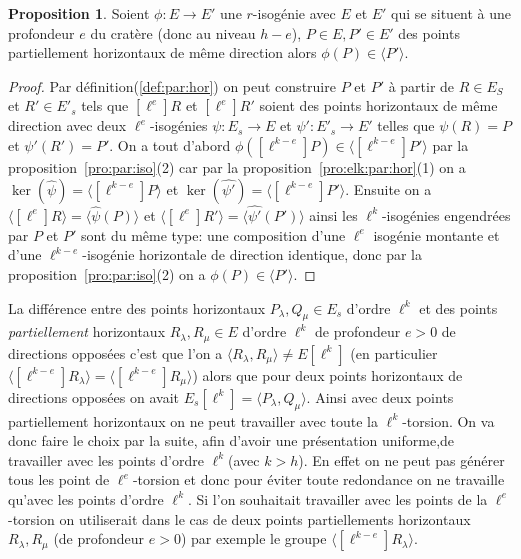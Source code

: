 \documentclass[10pt,a4paper]{book}
\theoremstyle{plain}
\theoremstyle{definition}
\theoremstyle{definition}
\theoremstyle{definition}
\newtheorem{prop}[thm]{Proposition}
\theoremstyle{definition}
\theoremstyle{remark}
\theoremstyle{remark}
\theoremstyle{definition}
\begin{document}
\begin{prop}
\label{pro:par:hor:par}
Soient $\phi: E \rightarrow E'$ une $r$-isogénie avec $E$ et $E'$ qui se
situent à une profondeur $e$ du cratère (donc au niveau $h-e$), $P \in E,P' \in
E'$ des points partiellement horizontaux de même direction alors $\phi(P) \in 
\langle P' \rangle$. 
\end{prop}

\begin{proof}
Par définition(\ref{def:par:hor}) on peut construire $P$ et $P'$ à 
partir de $R \in E_S$ et $R' \in E'_s$ tels que $[\ell^e]R$ et $[\ell^e]R'$ 
soient des points horizontaux de même direction avec deux $\ell^e$-isogénies 
$\psi:E_s \rightarrow E$ et $\psi':E'_s \rightarrow E'$ telles que $\psi(R)=P$ 
et $\psi'(R')=P'$. On a tout d'abord $ \phi([\ell^{k-e}]P) \in \langle 
[\ell^{k-e}]P' \rangle$  par la proposition~\ref{pro:par:iso}(2) car par la 
proposition~\ref{pro:elk:par:hor}(1) on a $\ker(\widehat{\psi})= \langle 
[\ell^{k-e}]P \rangle$ et $\ker(\widehat{\psi'})= \langle [\ell^{k-e}]P' 
\rangle$. Ensuite on a $\langle [\ell^e]R \rangle = \langle 
\widehat{\psi}(P) \rangle $ et $\langle [\ell^e]R' \rangle = \langle 
\widehat{\psi'}(P') \rangle$ ainsi les $\ell^{k}$-isogénies engendrées par 
$P$ et $P'$ sont du même type: une composition d'une $\ell^e$ isogénie montante 
et d'une $\ell^{k-e}$-isogénie horizontale de direction identique, donc par la 
proposition~\ref{pro:par:iso}(2) on a $\phi(P) \in \langle P' \rangle$.
\end{proof}


La différence entre des points horizontaux $P_{\lambda}, Q_{\mu} \in E_s$ 
d'ordre $\ell^k$ et des points \emph{partiellement} horizontaux $R_{\lambda}, 
R_{\mu} \in E$ d'ordre $\ell^k$ de profondeur $e>0$ de directions opposées 
c'est que l'on a $\langle R_{\lambda}, R_{\mu} \rangle \neq E[\ell^k]$ (en 
particulier$\langle [\ell^{k-e}]R_{\lambda} \rangle = \langle 
[\ell^{k-e}]R_{\mu} \rangle$) alors que pour deux points horizontaux de 
directions opposées on avait $E_s[\ell^k]= \langle P_{\lambda}, Q_{\mu} \rangle$. 
Ainsi avec deux points partiellement horizontaux on ne peut travailler avec 
toute la $\ell^k$-torsion. On va donc faire le choix par la suite, afin d'avoir
une présentation uniforme,de travailler avec les points d'ordre $\ell^k$(avec 
$k>h$). En effet on ne peut pas générer tous les point de $\ell^e$-torsion et 
donc pour éviter toute redondance on ne travaille qu'avec les points d'ordre 
$\ell^k$. Si l'on souhaitait travailler avec les points de la $\ell^e$-torsion 
on utiliserait dans le cas de deux points partiellements horizontaux 
$R_{\lambda}, R_{\mu}$ (de profondeur $e>0$) par exemple le groupe $\langle 
[\ell^{k-e}]R_{\lambda} \rangle$.
\end{document}
